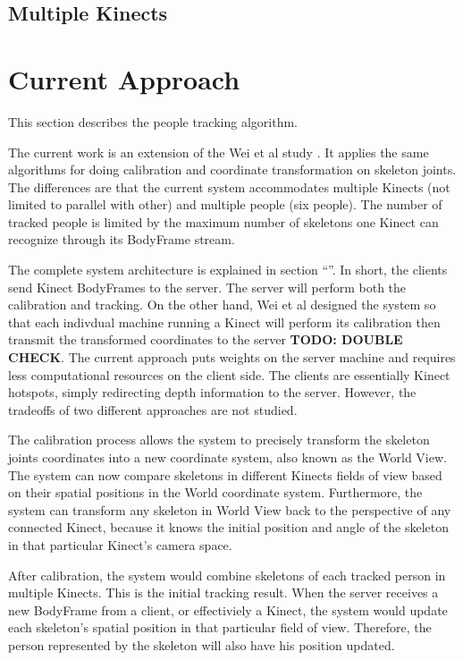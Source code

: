 \documentclass{sigchi}
\begin{document}
\subsection{Multiple Kinects}

\section{Current Approach}
\label{sec:current_approach}

This section describes the people tracking algorithm.

The current work is an extension of the Wei et al study \cite{wei_kinect_calibration}. It applies the same algorithms for doing calibration and coordinate transformation on skeleton joints. The differences are that the current system accommodates multiple Kinects (not limited to parallel with other) and multiple people (six people). The number of tracked people is limited by the maximum number of skeletons one Kinect can recognize through its BodyFrame stream.

The complete system architecture is explained in section ``''. In short, the clients send Kinect BodyFrames to the server. The server will perform both the calibration and tracking. On the other hand, Wei et al designed the system so that each indivdual machine running a Kinect will perform its calibration then transmit the transformed coordinates to the server \cite{wei_kinect_calibration} \textbf{TODO: DOUBLE CHECK}. The current approach puts weights on the server machine and requires less computational resources on the client side. The clients are essentially Kinect hotspots, simply redirecting depth information to the server. However, the tradeoffs of two different approaches are not studied.

The calibration process allows the system to precisely transform the skeleton joints coordinates into a new coordinate system, also known as the World View. The system can now compare skeletons in different Kinects fields of view based on their spatial positions in the World coordinate system. Furthermore, the system can transform any skeleton in World View back to the perspective of any connected Kinect, because it knows the initial position and angle of the skeleton in that particular Kinect's camera space.

After calibration, the system would combine skeletons of each tracked person in multiple Kinects. This is the initial tracking result. When the server receives a new BodyFrame from a client, or effectiviely a Kinect, the system would update each skeleton's spatial position in that particular field of view. Therefore, the person represented by the skeleton will also have his position updated.
\end{document}
